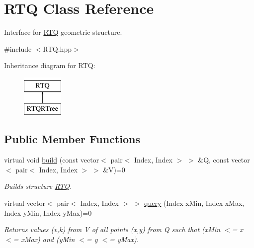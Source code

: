 \hypertarget{class_r_t_q}{\section{\-R\-T\-Q \-Class \-Reference}
\label{class_r_t_q}
}


\-Interface for \hyperlink{class_r_t_q}{\-R\-T\-Q} geometric structure.  




{\ttfamily \#include $<$\-R\-T\-Q.\-hpp$>$}

\-Inheritance diagram for \-R\-T\-Q\-:\begin{figure}[H]
\begin{center}
\leavevmode
\includegraphics[height=2.000000cm]{class_r_t_q}
\end{center}
\end{figure}
\subsection*{\-Public \-Member \-Functions}
\begin{DoxyCompactItemize}
\item 
virtual void \hyperlink{class_r_t_q_a6735bb4974ca680b5dc2367b98dc11eb}{build} (const vector$<$ pair$<$ \-Index, \-Index $>$ $>$ \&\-Q, const vector$<$ pair$<$ \-Index, \-Index $>$ $>$ \&\-V)=0
\begin{DoxyCompactList}\small\item\em \-Builds structure \hyperlink{class_r_t_q}{\-R\-T\-Q}. \end{DoxyCompactList}\item 
\hypertarget{class_r_t_q_a99dfe8340d96d3d78c9df1f5eed74471}{virtual vector$<$ pair$<$ \-Index, \*
\-Index $>$ $>$ \hyperlink{class_r_t_q_a99dfe8340d96d3d78c9df1f5eed74471}{query} (\-Index x\-Min, \-Index x\-Max, \-Index y\-Min, \-Index y\-Max)=0}\label{class_r_t_q_a99dfe8340d96d3d78c9df1f5eed74471}

\begin{DoxyCompactList}\small\item\em \-Returns values (v,k) from \-V of all points (x,y) from \-Q such that (x\-Min $<$= x $<$= x\-Max) and (y\-Min $<$= y $<$= y\-Max). \end{DoxyCompactList}\end{DoxyCompactItemize}


